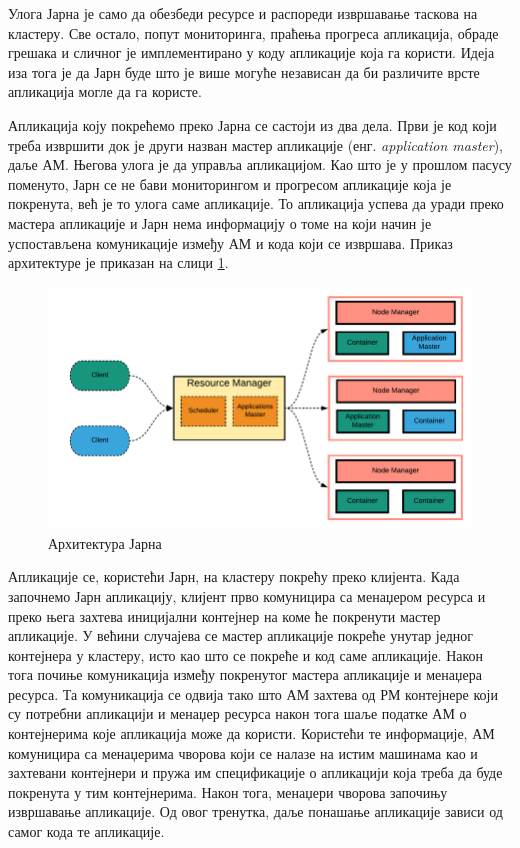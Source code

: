 \documentclass[12pt,oneside]{memoir}
\begin{document}
Улога Јарна је само да обезбеди ресурсе и распореди извршавање таскова на кластеру. Све остало, попут мониторинга, праћења прогреса апликација, обраде грешака и сличног је имплементирано у коду апликације која га користи. Идеја иза тога је да Јарн буде што је више могуће независан да би различите врсте апликација могле да га користе. \cite{hadoop_learning}

Апликација коју покрећемо преко Јарна се састоји из два дела. Први је код који треба извршити док је други назван мастер апликације (енг. \textit{application master}), даље АМ. Његова улога је да управља апликацијом. Као што је у прошлом пасусу поменуто, Јарн се не бави мониторингом и прогресом апликације која је покренута, већ је то улога саме апликације. То апликација успева да уради преко мастера апликације и Јарн нема информацију о томе на који начин је успостављена комуникације између АМ и кода који се извршава. Приказ архитектуре је приказан на слици \ref{fig:yarn_ar}. \cite{hadoop_learning}

\begin{figure}[!ht]
  \centering
  \includegraphics[width=1\textwidth]{pictures/yarn.png}
  \caption{Архитектура Јарна}
  \label{fig:yarn_ar}
\end{figure}

Апликације се, користећи Јарн, на кластеру покрећу преко клијента. Када започнемо Јарн апликацију, клијент прво комуницира са менаџером ресурса и преко њега захтева иницијални контејнер на коме ће покренути мастер апликације. У већини случајева се мастер апликације покреће унутар једног контејнера у кластеру, исто као што се покреће и код саме апликације. Након тога почиње комуникација између покренутог мастера апликације и менаџера ресурса. Та комуникација се одвија тако што АМ захтева од РМ контејнере који су потребни апликацији и менаџер ресурса након тога шаље податке АМ о контејнерима које апликација може да користи. Користећи те информације, АМ комуницира са менаџерима чворова који се налазе на истим машинама као и захтевани контејнери и пружа им спецификације о апликацији која треба да буде покренута у тим контејнерима. Након тога, менаџери чворова започињу извршавање апликације. Од овог тренутка, даље понашање апликације зависи од самог кода те апликације. \cite{hadoop_learning}
\end{document}

